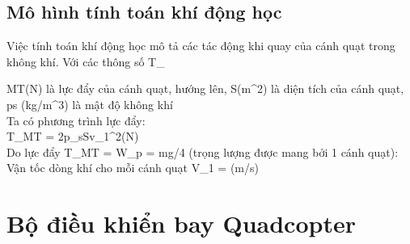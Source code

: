         \subsection{Mô hình tính toán khí động học}
        Việc tính toán khí động học mô tả các tác động khi quay của cánh quạt trong không khí. Với các thông số T_{MT(N) là lực đẩy của cánh quạt, hướng lên, S(m^2) là diện tích của cánh quạt, ps (kg/m^3) là mật độ không khí
        \\
        Ta có phương trình lực đẩy:
        \\
        T_{MT} = 2p_sSv_1^2(N)
        \\
        Do lực đẩy T_{MT} = W_p = mg/4 (trọng lượng được mang bởi 1 cánh quạt):
        \\
        Vận tốc dòng khí cho mỗi cánh quạt V_1 =  (m/s) 
     \section{Bộ điều khiển bay Quadcopter}
}

